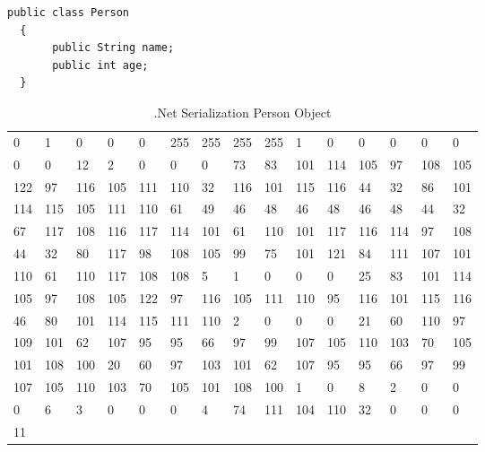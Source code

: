 \begin{lstlisting}[caption=Person Object, label=lst:javaperson]
  public class Person
  {
       public String name;
       public int age;
  }
\end{lstlisting}

\begin{table}[]
\centering
\begin{tabular}{lllllllllllllll}
0   & 1   & 0   & 0   & 0   & 255 & 255 & 255 & 255 & 1   & 0   & 0   & 0   & 0   & 0  \\
0   & 0   & 12  & 2   & 0   & 0   & 0   & 73  & 83  & 101 & 114 & 105 & 97  & 108 & 105\\
122 & 97  & 116 & 105 & 111 & 110 & 32  & 116 & 101 & 115 & 116 & 44  & 32  & 86  & 101\\
114 & 115 & 105 & 111 & 110 & 61  & 49  & 46  & 48  & 46  & 48  & 46  & 48  & 44  & 32 \\
67  & 117 & 108 & 116 & 117 & 114 & 101 & 61  & 110 & 101 & 117 & 116 & 114 & 97  & 108\\
44  & 32  & 80  & 117 & 98  & 108 & 105 & 99  & 75  & 101 & 121 & 84  & 111 & 107 & 101\\
110 & 61  & 110 & 117 & 108 & 108 & 5   & 1   & 0   & 0   & 0   & 25  & 83  & 101 & 114\\
105 & 97  & 108 & 105 & 122 & 97  & 116 & 105 & 111 & 110 & 95  & 116 & 101 & 115 & 116\\
46  & 80  & 101 & 114 & 115 & 111 & 110 & 2   & 0   & 0   & 0   & 21  & 60  & 110 & 97 \\
109 & 101 & 62  & 107 & 95  & 95  & 66  & 97  & 99  & 107 & 105 & 110 & 103 & 70  & 105\\
101 & 108 & 100 & 20  & 60  & 97  & 103 & 101 & 62  & 107 & 95  & 95  & 66  & 97  & 99 \\
107 & 105 & 110 & 103 & 70  & 105 & 101 & 108 & 100 & 1   & 0   & 8   & 2   & 0   & 0  \\
0   & 6   & 3   & 0   & 0   & 0   & 4   & 74  & 111 & 104 & 110 & 32  & 0   & 0   & 0  \\
11  &     &     &     &     &     &     &     &     &     &     &     &     &     &    \\
\end{tabular}
\caption[.Net Serialization Person Object]{.Net Serialization Person Object}
\label{tab:netserilazitaon}
\end{table}

